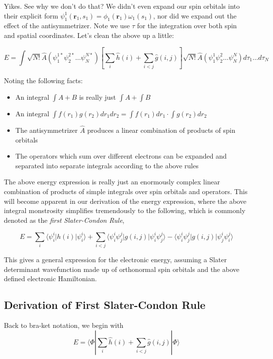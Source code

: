 \documentclass[11pt]{article}
\begin{document}
Yikes. See why we don't do that? We didn't even expand our spin orbitals
into their explicit form
\(\psi_1^1(\boldsymbol{r}_1,s_1) = \phi_1(\boldsymbol{r}_1) \omega_1(s_1)\), nor did we expand out the effect of the antisymmetrizer.
Note we use \(\tau\) for the integration over both spin and spatial
coordinates. Let's clean the above up a little:

\[E = \int \sqrt{N!} \hat{A} (\psi_1^{1*} \psi_2^{2*} \dots \psi_N^{N*})  \left[ \sum\limits_{i} \hat{h}(i) + \sum\limits_{i < j} \hat{g}(i,j) \right] \sqrt{N!} \hat{A} (\psi_1^{1} \psi_2^{2} \dots \psi_N^{N}) d\tau_1 \dots d\tau_N \]

Noting the following facts:

\begin{itemize}
\item An integral \(\int A + B\) is really just \(\int A + \int B\)
\item An integral $\int f(r_1) g(r_2) dr_1 dr_2 =\int f(r_1) dr_1 \cdot \int g(r_2) dr_2 $
\item The antisymmetrizer \(\hat{A}\) produces a linear combination of products of spin orbitals
\item The operators which sum over different electrons can be expanded and separated into separate integrals according to the above rules
\end{itemize}

The above energy expression is really just an enormously complex linear
combination of products of simple integrals over spin orbitals and
operators. This will become apparent in our derivation of the energy
expression, where the above integral monstrosity simplifies tremendously
to the following, which is commonly denoted as the \emph{first
Slater-Condon Rule},

\[ E =  \sum\limits_{i} \langle\psi_i^i|h(i)|\psi_i^i \rangle + \sum\limits_{i<j}  \langle \psi_i^i\psi_j^j|g(i,j)|\psi_i^i\psi_j^j \rangle - \langle \psi_i^i\psi_j^j|g(i,j)|\psi_j^i\psi_i^j \rangle \]

This gives a general expression for the electronic energy, assuming a
Slater determinant wavefunction made up of orthonormal spin orbitals and
the above defined electronic Hamiltonian. 
\subsection{Derivation of First Slater-Condon Rule}

Back to bra-ket notation, we begin with
\[E = \langle \Phi  | \sum\limits_{i} \hat{h}(i) + \sum\limits_{i < j} \hat{g}(i,j) | \Phi \rangle\]
\end{document}
